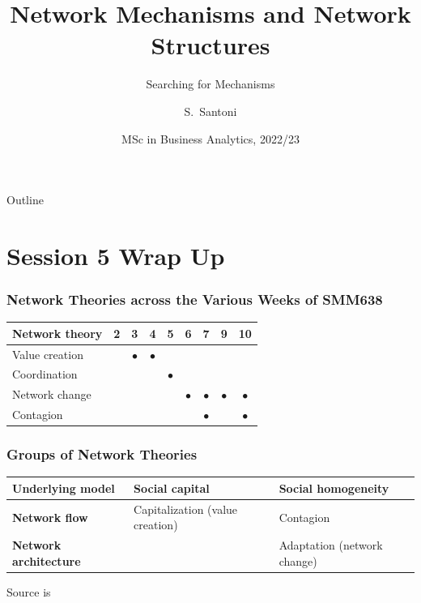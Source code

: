 \documentclass[notes, aspectratio=1610]{beamer}
\title[Network Mechanisms]
{Network Mechanisms and Network Structures}
\subtitle{Searching for Mechanisms}
\author{S.~Santoni\inst{1}\inst{2}}
\institute{
	\inst{1}%
	Bayes Business School
	\and
	\inst{2}%
	Soundcloud
	}
\date{MSc in Business Analytics, 2022/23}
\begin{document}
\begin{frame}
	\titlepage
\end{frame}

\begin{frame}{Outline}
	\tableofcontents
\end{frame}

\section{Session 5 Wrap Up}

\begin{frame}
	\frametitle{Network Theories across the Various Weeks of SMM638}
	\begin{table}
		\begin{tabular}[c]{l|c|c|c|c|c|c|c|c}
			\textbf{Network theory} & 
			\textbf{2} & 
			\textbf{3} & 
			\textbf{4} & 
			\textbf{5} & 
			\textbf{6} & 
			\textbf{7} & 
			\textbf{9} & 
			\textbf{10}\\
			\hline
			Value creation &  & $\bullet$ & $\bullet$ &  &  &  &  & \\	
			Coordination &  &  &  & $\bullet$ &  &  &  & \\	
			Network change &  &  &  &  & $\bullet$ & $\bullet$ & $\bullet$ & $\bullet$\\	
			Contagion &  &  &  &  &  & $\bullet$ &  & $\bullet$ \\	
		\end{tabular}
	\end{table}
\end{frame}

\begin{frame}
	\frametitle{Groups of Network Theories}
	\centering
	\small
	\begin{table}
		\begin{center}
			\begin{tabular}[c]{l|l|l}
				\textbf{Underlying model} & 
				\textbf{Social capital} &
				\textbf{Social homogeneity}\\
				\hline
				\textbf{Network flow} &
				Capitalization (value creation) & 
				Contagion  \\
				\hline
				\textbf{Network architecture} & 
				\cellcolor{blue!20}{\color{black}{Coordination}} & 
				Adaptation  (network change)\\
			\end{tabular}
		\end{center}
	\end{table}

	\vspace{1em}

	\raggedright \small Source is~\cite[][page 47]{scott2011}
\end{frame}
\end{document}
